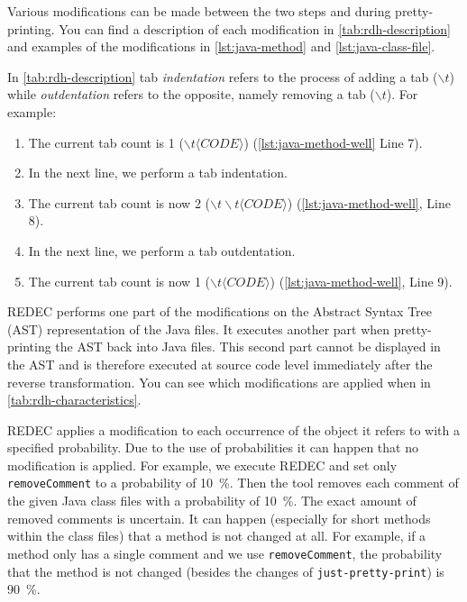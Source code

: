 \documentclass[%
class=scrreprt,
chapterprefix=false,%
open=right,%
twoside=false,%
paper=a4,%
logofile={Logo\_zentral\_farbig\_EN.png},%
thesistype=master,%
UKenglish,%
]{se2thesis}
\theoremstyle{definition}
\newcommand{\rdh}{REDEC\xspace}
\newcommand{\none}{just-pretty-print\xspace} %
\newcommand{\nonet}{\texttt{\none}\xspace} %
\begin{document}
	
	Various modifications can be made between the two steps and during pretty-printing. You can find a description of each modification in \autoref{tab:rdh-description} and examples of the modifications in \autoref{lst:java-method} and \autoref{lst:java-class-file}.
	
	In \autoref{tab:rdh-description} tab \textit{indentation} refers to the process of adding a tab ($\backslash t$) while \textit{outdentation} refers to the opposite, namely removing a tab ($\backslash t$). 
	For example:
	\begin{enumerate}
		\item The current tab count is 1 ($\backslash t \langle CODE \rangle$) (\autoref{lst:java-method-well} Line 7).
		\item In the next line, we perform a tab indentation.
		\item The current tab count is now 2 ($\backslash t \backslash t \langle CODE \rangle $) (\autoref{lst:java-method-well}, Line 8).
		\item In the next line, we perform a tab outdentation.
		\item The current tab count is now 1 ($\backslash t \langle CODE \rangle $) (\autoref{lst:java-method-well}, Line 9).
	\end{enumerate}
		
	\rdh performs one part of the modifications on the Abstract Syntax Tree (AST) representation of the Java files. It executes another part when pretty-printing the AST back into Java files. This second part cannot be displayed in the AST and is therefore executed at source code level immediately after the reverse transformation. You can see which modifications are applied when in \autoref{tab:rdh-characteristics}.
	
	\rdh applies a modification to each occurrence of the object it refers to with a specified probability. Due to the use of probabilities it can happen that no modification is applied. For example, we execute \rdh and set only \texttt{removeComment} to a probability of 10~\%. Then the tool removes each comment of the given Java class files with a probability of 10~\%. The exact amount of removed comments is uncertain. It can happen (especially for short methods within the class files) that a method is not changed at all. For example, if a method only has a single comment and we use \texttt{removeComment}, the probability that the method is not changed (besides the changes of \nonet) is 90~\%.
\end{document}
